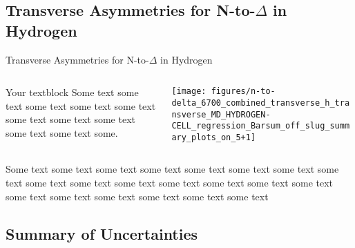 \documentclass[xcolor=x11names,compress,8pt]{beamer}
\renewcommand{\(}{\begin{columns}}
\renewcommand{\)}{\end{columns}}
\newcommand{\<}[1]{\begin{column}{#1}}
\renewcommand{\>}{\end{column}}
\begin{document}
\subsection{Transverse Asymmetries for N-to-$\Delta$ in Hydrogen}
\begin{frame}{Transverse Asymmetries for N-to-$\Delta$ in Hydrogen}

  \begin{columns}[T]
    \begin{column}{0.25\textwidth}
     \begin{block}{Your textblock}
	\pause
	Some text some text some text some text some text some text some text some text some text some text some.
    \end{block}
    \end{column}
    \begin{column}{0.8\textwidth}
    \begin{block}{}
	\texttt{[image: figures/n-to-delta\_6700\_combined\_transverse\_h\_transverse\_MD\_HYDROGEN-CELL\_regression\_Barsum\_off\_slug\_summary\_plots\_on\_5+1]}
    \end{block}
    \end{column}
  \end{columns}

	\pause
Some text some text some text some text some text some text some text some text some text some text some text some text some text some text some text some text some text some text some text some text some text

\end{frame}




\subsection{Summary of Uncertainties}
\end{document}
